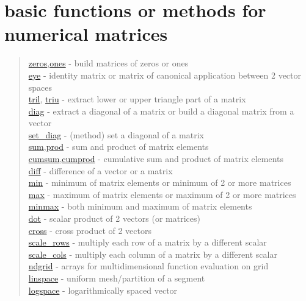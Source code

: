 \chapter*{basic functions or methods for numerical matrices}

\begin{quote}
\noindent
\hyperlink{zeros}{zeros},\hyperlink{ones}{ones} - build matrices of zeros or ones \\
\hyperlink{eye}{eye} - identity matrix or matrix of canonical application between 2 vector spaces \\
\hyperlink{tril}{tril}, \hyperlink{triu}{triu} - extract lower or upper triangle part of a matrix \\
\hyperlink{diag}{diag} - extract a diagonal of a matrix or build a diagonal matrix from a vector \\
\hyperlink{set_diag}{set\_diag} - (method) set a diagonal of a matrix \\
\hyperlink{sum}{sum},\hyperlink{prod}{prod} - sum and product of matrix elements \\
\hyperlink{cumsum}{cumsum},\hyperlink{cumprod}{cumprod} - cumulative sum and product of matrix elements \\
\hyperlink{diff}{diff} - difference of a vector or a matrix \\
\hyperlink{min}{min} - minimum of matrix elements or minimum of 2 or more matrices \\
\hyperlink{max}{max} - maximum of matrix elements or maximum of 2 or more matrices \\
\hyperlink{minmax}{minmax} - both minimum and maximum of matrix elements\\
\hyperlink{dot}{dot} - scalar product of 2 vectors (or matrices) \\
\hyperlink{cross}{cross} - cross product of 2 vectors \\
\hyperlink{scale_rows}{scale\_rows} - multiply each row of a matrix by a different scalar \\
\hyperlink{scale_cols}{scale\_cols} - multiply each column of a matrix by a different scalar \\
\hyperlink{ndgrid}{ndgrid} - arrays for multidimensional function evaluation on grid \\
\hyperlink{linspace}{linspace} - uniform mesh/partition of a segment \\
\hyperlink{logspace}{logspace} - logarithmically spaced vector \\
\end{quote}
 
 
  
  
  
  
 
 
 
 
 
 

  
  
  

